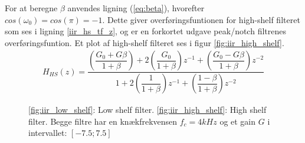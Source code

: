 

     For at beregne $\beta$ anvendes ligning (\ref{eq:beta}), hvorefter $cos(\omega_0) = cos(\pi) = -1$. Dette giver overføringsfuntionen for high-shelf filteret som ses i ligning \ref{iir_hs_tf_z}, og er en forkortet udgave peak/notch filtrenes overføringsfuntion. Et plot af high-shelf filteret ses i figur \ref{fig:iir_high_shelf}.
     \begin{align}
     H_{HS}(z) = \dfrac{\left(\dfrac{G_0 + G \beta}{1 + \beta} \right)+ 2 \left(\dfrac{G_0 }{1 +\beta} \right)z^{-1} + \left(\dfrac{ G_0 - G \beta}{1 + \beta }\right) z^{-2}}{1 + 2 \left(\dfrac{1}{1 + \beta}\right)z^{-1} + \left( \dfrac{1 - \beta}{1 + \beta} \right) z^{-2}}\label{iir_hs_tf_z}
     \end{align}
%
%


\begin{figure}[h]
	\centering
	\caption{\ref{fig:iir_low_shelf}: Low shelf filter. \hspace{4cm} \ref{fig:iir_high_shelf}: High shelf filter. \newline Begge filtre har en knækfrekvensen $f_c = 4kHz$ og et gain $G$ i intervallet: $[-7.5 ; 7.5]$}
\end{figure}
\FloatBlock

